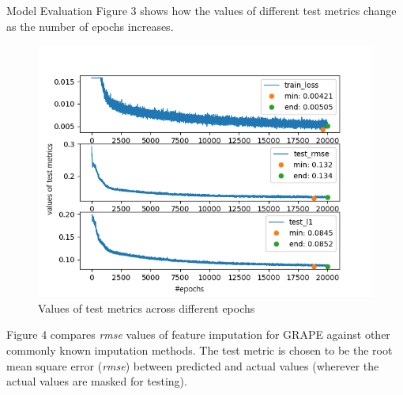 \documentclass[final]{beamer}
\newlength{\sepwidth}
\newlength{\colwidth}
\newlength{\twocolwidth}
\newcommand{\separatorcolumn}{\begin{column}{\sepwidth}\end{column}}
\begin{document}
\begin{frame}[t]
\begin{columns}[t]
\begin{column}{\twocolwidth}
\separatorcolumn
\vspace{-3cm}
\begin{columns}[t, totalwidth=\twocolwidth]
\begin{column}{\colwidth}

  \begin{block}{Model Evaluation}
   Figure 3 shows how the values of different test metrics change as the number of epochs increases.

     \begin{figure}
 	    \includegraphics[width=1\textwidth]{figures/curves.png}
 	    \caption{Values of test metrics across different epochs}
 	    \label{cdft}
    \end{figure}
  
  Figure 4 compares \textit{rmse} values of feature imputation for GRAPE against other commonly known imputation methods. The test metric is chosen to be the root mean square error (\textit{rmse}) between predicted and actual values (wherever the actual values are masked for testing).
  

\end{block}
\end{column}
\end{columns}
\end{column}
\end{columns}
\end{frame}
\end{document}
